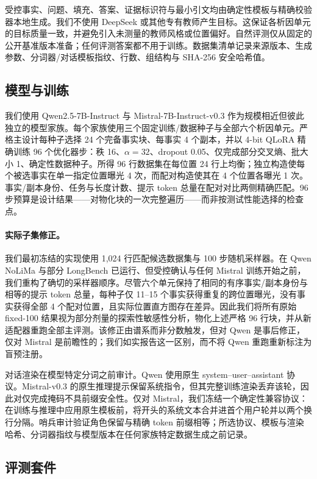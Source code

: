 \documentclass[11pt]{article}
\begin{document}
受控事实、问题、填充、答案、证据标识符与最小引文均由确定性模板与精确校验器本地生成。我们不使用 DeepSeek 或其他专有教师产生目标。这保证各析因单元的目标质量一致，并避免引入未测量的教师风格或位置偏好。自然评测仅从固定的公开基准版本准备；任何评测答案都不用于训练。数据集清单记录来源版本、生成参数、分词器/对话模板指纹、行数、组结构与 SHA-256 安全哈希值。

\subsection{模型与训练}

我们使用 Qwen2.5-7B-Instruct 与 Mistral-7B-Instruct-v0.3 作为规模相近但彼此独立的模型家族。每个家族使用三个固定训练/数据种子与全部六个析因单元。严格主设计每种子选择 24 个完备事实块、每事实 4 个副本，并以 4-bit QLoRA 精确训练 96 个优化器步：秩 16、$\alpha=32$、dropout 0.05、仅完成部分交叉熵、批大小 1、确定性数据种子。所得 96 行数据集在每位置 24 行上均衡；独立构造使每个被选事实在单一指定位置曝光 4 次，而配对构造使其在 4 个位置各曝光 1 次。事实/副本身份、任务与长度计数、提示 token 总量在配对对比两侧精确匹配。96 步预算是设计结果——对物化块的一次完整遍历——而非按测试性能选择的检查点。

\paragraph{实际子集修正。}
我们最初冻结的实现使用 1,024 行匹配候选数据集与 100 步随机采样器。在 Qwen NoLiMa 与部分 LongBench 已运行、但受控确认与任何 Mistral 训练开始之前，我们重构了确切的采样器顺序。尽管六个单元保持了相同的有序事实/副本身份与相等的提示 token 总量，每种子仅 11--15 个事实获得重复的跨位置曝光，没有事实获得全部 4 个配对位置，且实际位置直方图存在差异。因此我们将所有原始 fixed-100 结果视为部分剂量的探索性敏感性分析，物化上述严格 96 行块，并从新适配器重跑全部主评测。该修正由谱系而非分数触发，但对 Qwen 是事后修正，仅对 Mistral 是前瞻性的；我们如实报告这一区别，而不将 Qwen 重跑重新标注为盲预注册。

对话渲染在模型特定分词之前审计。Qwen 使用原生 system--user--assistant 协议。Mistral-v0.3 的原生推理提示保留系统指令，但其完整训练渲染丢弃该轮，因此对仅完成掩码不具前缀安全性。仅对 Mistral，我们冻结一个确定性兼容协议：在训练与推理中应用原生模板前，将开头的系统文本合并进首个用户轮并以两个换行分隔。哨兵审计验证角色保留与精确 token 前缀相等；所选协议、模板与渲染哈希、分词器指纹与模型版本在任何家族特定数据生成之前记录。

\subsection{评测套件}
\end{document}
